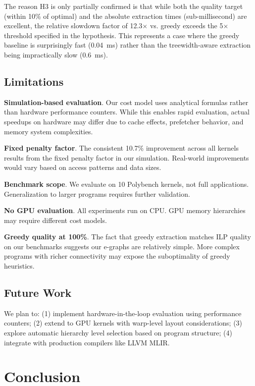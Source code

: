 \documentclass[11pt]{article}
\begin{document}
The reason H3 is only partially confirmed is that while both the quality target (within 10\% of optimal) and the absolute extraction times (sub-millisecond) are excellent, the relative slowdown factor of 12.3$\times$ vs. greedy exceeds the 5$\times$ threshold specified in the hypothesis. This represents a case where the greedy baseline is surprisingly fast (0.04~ms) rather than the treewidth-aware extraction being impractically slow (0.6~ms).

\subsection{Limitations}

\textbf{Simulation-based evaluation}. Our cost model uses analytical formulas rather than hardware performance counters. While this enables rapid evaluation, actual speedups on hardware may differ due to cache effects, prefetcher behavior, and memory system complexities.

\textbf{Fixed penalty factor}. The consistent 10.7\% improvement across all kernels results from the fixed penalty factor in our simulation. Real-world improvements would vary based on access patterns and data sizes.

\textbf{Benchmark scope}. We evaluate on 10 Polybench kernels, not full applications. Generalization to larger programs requires further validation.

\textbf{No GPU evaluation}. All experiments run on CPU. GPU memory hierarchies may require different cost models.

\textbf{Greedy quality at 100\%}. The fact that greedy extraction matches ILP quality on our benchmarks suggests our e-graphs are relatively simple. More complex programs with richer connectivity may expose the suboptimality of greedy heuristics.

\subsection{Future Work}

We plan to: (1) implement hardware-in-the-loop evaluation using performance counters; (2) extend to GPU kernels with warp-level layout considerations; (3) explore automatic hierarchy level selection based on program structure; (4) integrate with production compilers like LLVM MLIR.

\section{Conclusion}
\label{sec:conclusion}
\end{document}
